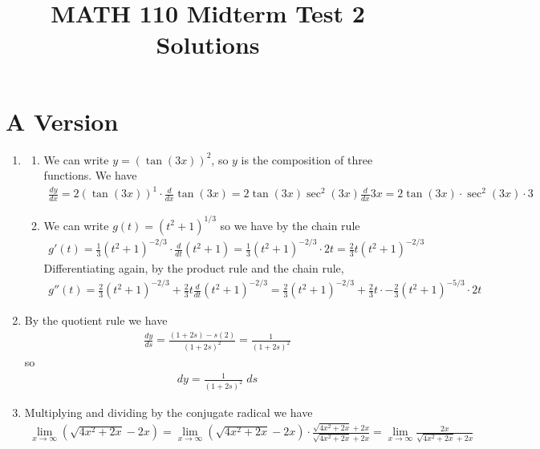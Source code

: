 \documentclass{article}
\title{MATH 110 Midterm Test 2 Solutions}
\author{\commonAuthor}
\date{\commonDateMTTwo}
\begin{document}
\maketitle

\section{A Version}

\begin{enumerate}
\item
  \begin{enumerate}
  \item We can write $y=(\tan(3x))^2$, so $y$ is the composition of three
    functions.  We have 
    \begin{align*}
      \frac{dy}{dx} = 2(\tan(3x))^1 \cdot \frac{d}{dx} \tan(3x)
      = 2\tan(3x) \sec^2(3x) \frac{d}{dx} 3x
      = 2\tan(3x) \cdot \sec^2(3x) \cdot 3
    \end{align*}
  \item We can write $g(t)=(t^2+1)^{1/3}$ so we have by the chain rule
    \begin{align*}
      g'(t) = \frac{1}{3} (t^2+1)^{-2/3} \cdot \frac{d}{dt} (t^2+1)
      = \frac{1}{3} (t^2+1)^{-2/3} \cdot 2t
      = \frac{2}{3} t(t^2+1)^{-2/3}
    \end{align*}
    Differentiating again, by the product rule and the chain rule,
    \begin{align*}
      g''(t) = \frac{2}{3} (t^2+1)^{-2/3} 
      + \frac{2}{3} t \frac{d}{dt} (t^2+1)^{-2/3}
      = \frac{2}{3} (t^2+1)^{-2/3} 
      + \frac{2}{3} t \cdot -\frac{2}{3}(t^2+1)^{-5/3} \cdot 2t
    \end{align*}
  \end{enumerate}
\item By the quotient rule we have
  \begin{align*}
    \frac{dy}{ds} = \frac{(1+2s)-s(2)}{(1+2s)^2}
    = \frac{1}{(1+2s)^2}
  \end{align*}
  so
  \begin{align*}
    dy = \frac{1}{(1+2s)^2} \; ds
  \end{align*}
\item Multiplying and dividing by the conjugate radical we have
  \begin{align*}
    \lim_{x\to\infty} \left(\sqrt{4x^2+2x}-2x\right)
    = \lim_{x\to\infty} \left(\sqrt{4x^2+2x}-2x\right)
    \cdot \frac{\sqrt{4x^2+2x}+2x}{\sqrt{4x^2+2x}+2x}
    = \lim_{x\to\infty} \frac{2x}{\sqrt{4x^2+2x}+2x}

\end{align*}
\end{enumerate}
\end{document}
